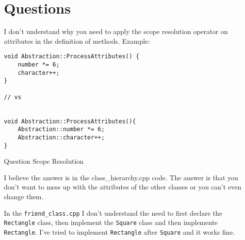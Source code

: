 \documentclass[11pt, a4paper]{article}
\begin{document}
\section{Questions}%
\label{sec:questions}


I don't understand why you need to apply the scope resolution operator on attributes in the definition of methods. Example:


\begin{listing}[hbt!]
\begin{verbatim}
void Abstraction::ProcessAttributes() {
    number *= 6;
    character++;
}

// vs


void Abstraction::ProcessAttributes(){
	Abstraction::number *= 6;
	Abstraction::character++;
}
\end{verbatim}
\caption{Question Scope Resolution}
\label{lst:question_scope_resolution}
\end{listing}

I believe the answer is in the class\_hierarchy.cpp code. The answer is that you don't want to mess up with the attributes of the other classes or you can't even change them.





In the \texttt{friend\_class.cpp} I don't understand the need to first declare the \texttt{Rectangle} class, then implement the \texttt{Square} class and then implemente \texttt{Rectangle}. I've tried to implement \texttt{Rectangle} after \texttt{Square} and it works fine.
\end{document}
